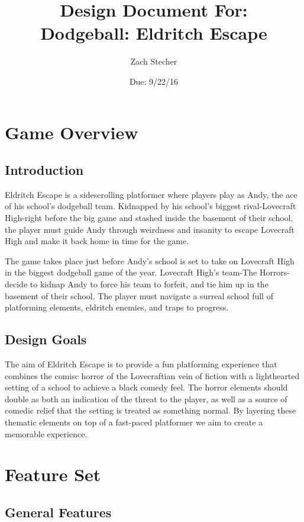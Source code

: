 \documentclass [12pt]{article}
\title{\small{\textbf{Design Document For:}}\\[1in]{\Huge{\textbf{Dodgeball: Eldritch Escape}}}}
\author{Zach Stecher}
\date{Due: 9/22/16}
\begin{document}
\maketitle
\newpage

\section*{Game Overview}

\subsection*{Introduction}

Eldritch Escape is a sidescrolling platformer where players play as Andy, the ace of his school's dodgeball team. Kidnapped by his school's biggest rival-Lovecraft High-right before the big game and stashed inside the basement of their school, the player must guide Andy through weirdness and insanity to escape Lovecraft High and make it back home in time for the game.

The game takes place just before Andy's school is set to take on Lovecraft High in the biggest dodgeball game of the year. Lovecraft High's team-The Horrors-decide to kidnap Andy to force  his team to forfeit, and tie him up in the basement of their school. The player must navigate a surreal school full of platforming elements, eldritch enemies, and traps to progress.

\subsection*{Design Goals}

The aim of Eldritch Escape is to provide a fun platforming experience that combines the comisc horror of the Lovecraftian vein of fiction with a lighthearted setting of a school to achieve a black comedy feel. The horror elements should double as both an indication of the threat to the player, as well as a source of comedic relief that the setting is treated as something normal. By layering these thematic elements on top of a fast-paced platformer we aim to create a memorable experience.

\section*{Feature Set}

\subsection*{General Features}
\end{document}
